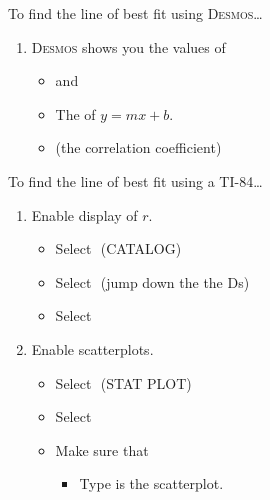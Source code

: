 \begin{minipage}[t]{0.5\textwidth}
\begin{myConcept}{To find the line of best fit using {\scshape Desmos}\dots}
\begin{enumerate}
\begin{itemize}
            \end{itemize}
        \item {\scshape Desmos} shows you the values of
            \begin{itemize}
                \item {} and  %
                \item The  of $y=mx+b$.
                \item {} (the correlation coefficient)
            \end{itemize}
    \end{enumerate}
\end{myConcept}
\end{minipage}
%
\begin{minipage}[t]{0.5\textwidth}
    \begin{myConcept}{To find the line of best fit using a {\scshape TI-84}\dots}
        \begin{enumerate}
            \item Enable display of $r$.
                \begin{itemize}
                    \item Select 
                        \,\,{\footnotesize\ttfamily (CATALOG)}
                    \item Select 
                        \,\,{\footnotesize (jump down the the Ds)}
                    \item Select 
                \end{itemize}
            \item Enable scatterplots.
                \begin{itemize}
                    \item Select 
                        \,\,{\footnotesize\ttfamily (STAT PLOT)}
                    \item Select 
                    \item Make sure that 
                        \begin{itemize} 
                            \item {\ttfamily Type} is the scatterplot.

\end{itemize}
\end{itemize}
\end{enumerate}
\end{myConcept}
\end{minipage}

